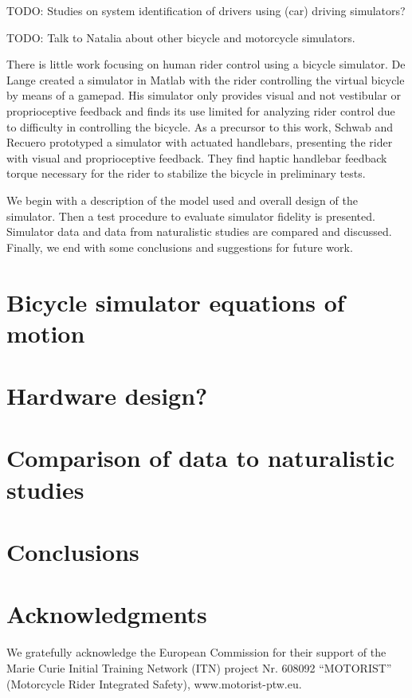 \documentclass[11pt,a4paper]{amsart}
\begin{document}
TODO: Studies on system identification of drivers using (car) driving simulators?

TODO: Talk to Natalia about other bicycle and motorcycle simulators.

There is little work focusing on human rider control using a bicycle simulator.
De Lange created a simulator in Matlab with the rider controlling the virtual bicycle by means of a
gamepad\cite{delange2011}.
His simulator only provides visual and not vestibular or proprioceptive feedback and finds its use limited for
analyzing rider control due to difficulty in controlling the bicycle.
As a precursor to this work, Schwab and Recuero prototyped a simulator with actuated handlebars\cite{schwab2013},
presenting the rider with visual and proprioceptive feedback.
They find haptic handlebar feedback torque necessary for the rider to stabilize the bicycle in preliminary tests.

We begin with a description of the model used and overall design of the simulator.
Then a test procedure to evaluate simulator fidelity is presented.
Simulator data and data from naturalistic studies are compared and discussed.
Finally, we end with some conclusions and suggestions for future work.

\section{Bicycle simulator equations of motion}

\section{Hardware design?}

\section{Comparison of data to naturalistic studies}

\section{Conclusions}

\section{Acknowledgments}
We gratefully acknowledge the European Commission for their support of the Marie Curie Initial Training Network (ITN)
project Nr. 608092 “MOTORIST” (Motorcycle Rider Integrated Safety), www.motorist-ptw.eu.

\nocite{meijaard2007}


\end{document}
